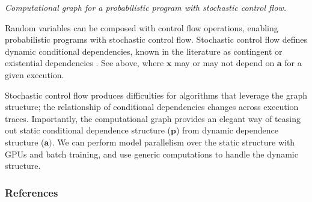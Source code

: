 {\small\textit{Computational graph for a probabilistic program with stochastic control flow.}}

Random variables can be composed with control flow operations,
enabling probabilistic programs with stochastic control flow.
%
Stochastic control flow defines dynamic conditional dependencies,
known in the literature as contingent or existential dependencies
\citep{mansinghka2014venture,wu2016swift}.
See above, where $\mathbf{x}$ may or may not depend on $\mathbf{a}$
for a given execution.

Stochastic control flow produces difficulties for algorithms that
leverage the graph structure; the relationship of conditional
dependencies changes across execution traces.
Importantly, the computational graph provides an elegant way of
teasing out static conditional dependence structure ($\mathbf{p}$)
from dynamic dependence structure ($\mathbf{a})$. We can perform
model parallelism over the static structure with GPUs and batch
training, and use generic computations to handle the dynamic
structure.

\subsubsection{References}\label{references}
